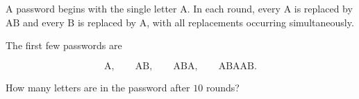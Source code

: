 A password begins with the single letter $\mathrm{A}$. In each round, every $\mathrm{A}$ is replaced by $\mathrm{AB}$ and every $\mathrm{B}$ is replaced by $\mathrm{A}$, with all replacements occurring simultaneously.

The first few passwords are

\[
\mathrm{A},\qquad
\mathrm{AB},\qquad
\mathrm{ABA},\qquad
\mathrm{ABAAB}.
\]

How many letters are in the password after $10$ rounds?
